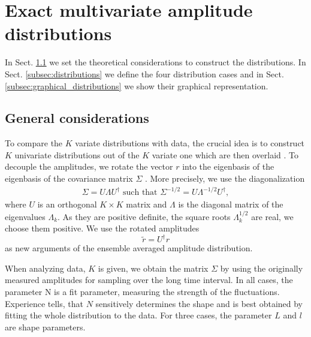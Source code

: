 \section{Exact multivariate amplitude distributions}
\label{sec:exact_distributions}


In Sect. \ref{subsec:general_considerations} we set the theoretical
considerations to construct the distributions. In Sect.
\ref{subsec:distributions} we define the four distribution cases and in Sect.
\ref{subsec:graphical_distributions} we show their graphical representation.

\subsection{General considerations}\label{subsec:general_considerations}

To compare the $K$ variate distributions with data, the crucial idea is to
construct $K$ univariate distributions out of the $K$ variate one which are
then overlaid \cite{exact_distributions_guhr}. To decouple the amplitudes, we
rotate the vector $r$ into the eigenbasis of the eigenbasis of the covariance
matrix $\Sigma$ \cite{non_stationarity_fin_guhr,exact_distributions_guhr}. More
precisely, we use the diagonalization
\begin{align}
    \Sigma = U \Lambda U^{\dagger} \text{ such that }
    \Sigma^{-1/2} = U \Lambda^{-1/2} U^{\dagger},
\end{align}
where $U$ is an orthogonal $K \times K$ matrix and $\Lambda$ is the diagonal
matrix of the eigenvalues $\Lambda_{k}$. As they are positive definite, the
square roots $\Lambda_{k}^{1/2}$ are real, we choose them positive. We use the
rotated amplitudes
\begin{equation}
    \tilde{r} = U^{\dagger} r
\end{equation}
as new arguments of the ensemble averaged amplitude distribution.

When analyzing data, $K$ is given, we obtain the matrix $\Sigma$ by using the
originally measured amplitudes for sampling over the long time interval. In all
cases, the parameter N is a fit parameter, measuring the strength of the
fluctuations. Experience tells, that $N$ sensitively determines the shape and
is best obtained by fitting the whole distribution to the data. For three
cases, the parameter $L$ and $l$ are shape parameters.

